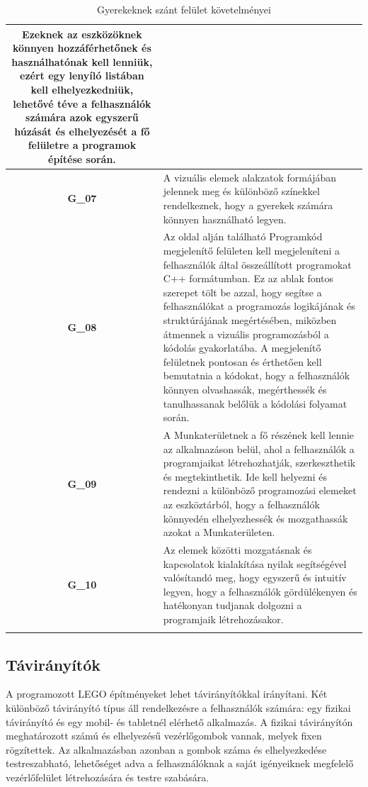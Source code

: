 \documentclass{article}
\begin{document}
\begin{longtable}{|c|p{14cm}|}
Ezeknek az eszközöknek könnyen hozzáférhetőnek és használhatónak kell lenniük, ezért egy lenyíló listában kell elhelyezkedniük, lehetővé téve a felhasználók számára azok egyszerű húzását és elhelyezését a fő felületre a programok építése során.\\\hline

\textbf{G\_07} & A vizuális elemek alakzatok formájában jelennek meg és különböző színekkel rendelkeznek, hogy a gyerekek számára könnyen használható legyen. \\\hline
\textbf{G\_08} & Az oldal alján található Programkód megjelenítő felületen kell megjeleníteni a felhasználók által összeállított programokat C++ formátumban. Ez az ablak fontos szerepet tölt be azzal, hogy segítse a felhasználókat a programozás logikájának és struktúrájának megértésében, miközben átmennek a vizuális programozásból a kódolás gyakorlatába. A megjelenítő felületnek pontosan és érthetően kell bemutatnia a kódokat, hogy a felhasználók könnyen olvashassák, megérthessék és tanulhassanak belőlük a kódolási folyamat során.\\\hline

\textbf{G\_09} & A Munkaterületnek a fő részének kell lennie az alkalmazáson belül, ahol a felhasználók a programjaikat létrehozhatják, szerkeszthetik és megtekinthetik. Ide kell helyezni és rendezni a különböző programozási elemeket az eszköztárból, hogy a felhasználók könnyedén elhelyezhessék és mozgathassák azokat a Munkaterületen.\\\hline

\textbf{G\_10} & Az elemek közötti mozgatásnak és kapcsolatok kialakítása nyilak segítségével valósítandó meg, hogy egyszerű és intuitív legyen, hogy a felhasználók gördülékenyen és hatékonyan tudjanak dolgozni a programjaik létrehozásakor. \\\hline
\hline
\caption{Gyerekeknek szánt felület követelményei}
\end{longtable}
\endgroup

\subsection{Távirányítók}

A programozott LEGO építményeket lehet távirányítókkal irányítani. Két különböző távirányító típus áll rendelkezésre a felhasználók számára: egy fizikai távirányító és egy mobil- és tabletnél elérhető alkalmazás. A fizikai távirányítón meghatározott számú és elhelyezésű vezérlőgombok vannak, melyek fixen rögzítettek. Az alkalmazásban azonban a gombok száma és elhelyezkedése testreszabható, lehetőséget adva a felhasználóknak a saját igényeiknek megfelelő vezérlőfelület létrehozására és testre szabására.
\end{document}
